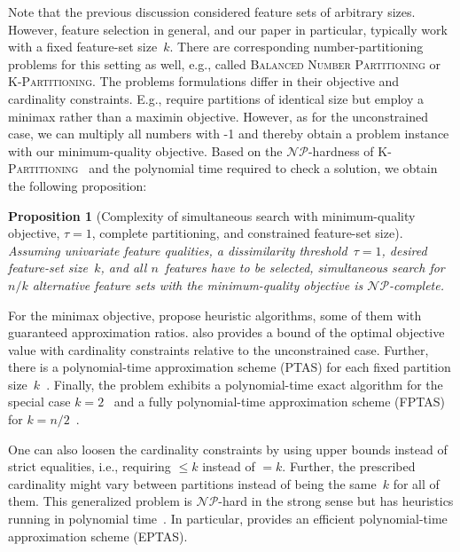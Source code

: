\documentclass{article}
\newtheorem{proposition}[corollary]{Proposition} %
\theoremstyle{definition}
\begin{document}
Note that the previous discussion considered feature sets of arbitrary sizes.
However, feature selection in general, and our paper in particular, typically work with a fixed feature-set size~$k$.
There are corresponding number-partitioning problems for this setting as well, e.g., called \textsc{Balanced Number Partitioning} or \textsc{K-Partitioning}.
The problems formulations differ in their objective and cardinality constraints.
E.g., \cite{babel1998thek, michiels2012computer, zhang2011heuristic} require partitions of identical size but employ a minimax rather than a maximin objective.
However, as for the unconstrained case, we can multiply all numbers with -1 and thereby obtain a problem instance with our minimum-quality objective.
Based on the $\mathcal{NP}$-hardness of \textsc{K-Partitioning}~\cite{babel1998thek} and the polynomial time required to check a solution, we obtain the following proposition:
%
\begin{proposition}[Complexity of simultaneous search with minimum-quality objective, $\tau=1$, complete partitioning, and constrained feature-set size]
	Assuming univariate feature qualities, a dissimilarity threshold~$\tau = 1$, desired feature-set size~$k$, and all $n$~features have to be selected, simultaneous search for $n/k$ alternative feature sets with the minimum-quality objective is $\mathcal{NP}$-complete.
	\label{prop:afs:complexity-partitioning-min-constrained-k}
\end{proposition}
%
For the minimax objective, \cite{babel1998thek, michiels2012computer, zhang2011heuristic} propose heuristic algorithms, some of them with guaranteed approximation ratios.
\cite{babel1998thek} also provides a bound of the optimal objective value with cardinality constraints relative to the unconstrained case.
Further, there is a polynomial-time approximation scheme (PTAS) for each fixed partition size~$k$~\cite{michiels2012computer}.
Finally, the problem exhibits a polynomial-time exact algorithm for the special case $k=2$~\cite{dellamico2004heuristic, dellamico2001bounds} and a fully polynomial-time approximation scheme (FPTAS) for $k=n/2$~\cite{woeginger2005comment}.

One can also loosen the cardinality constraints by using upper bounds instead of strict equalities, i.e., requiring $\leq k$ instead of $= k$.
Further, the prescribed cardinality might vary between partitions instead of being the same~$k$ for all of them.
This generalized problem is $\mathcal{NP}$-hard in the strong sense but has heuristics running in polynomial time~\cite{kellerer2011a32approximation}.
In particular, \cite{chen2016efficient} provides an efficient polynomial-time approximation scheme (EPTAS).
\end{document}
